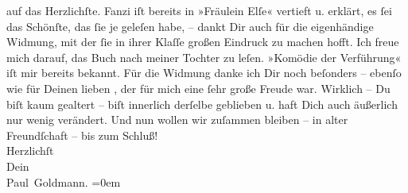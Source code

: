 \begin{ledgroupsized}[t]{13cm}
               auf das Herzlichſte. Fanzi iſt bereits in »Fräulein Elſe« vertieft u. erklärt, es ſei das
               Schönſte, das ſie je geleſen habe, – dankt Dir auch für die eigenhändige Widmung, mit
               der ſie in ihrer Klaſſe großen Eindruck zu machen hofft. Ich freue mich darauf, das
                  Buch nach meiner Tochter zu leſen. »Komödie der Verführung« iſt mir bereits bekannt.
               Für die Widmung danke ich Dir noch beſonders – ebenſo wie für Deinen lieben \label{K_L03479-2v}\label{K_L03479-2h}, der für mich eine ſehr große Freude war. Wirklich – Du {\pb}biſt kaum gealtert – biſt innerlich derſelbe
               geblieben u. haft Dich auch äußerlich nur wenig verändert.\pend
           \pstart
           Und nun wollen wir zuſammen bleiben – in alter Freundſchaft – bis zum Schluß!
               {\\[\baselineskip]}Herzlichſt {\\[\baselineskip]}Dein {\\[\baselineskip]}\spacefill\mbox{Paul Goldmann.}\pend
           \leftskip=0em{}
         
         \endnumbering{}\end{ledgroupsized}\begin{anhang}\end{anhang}\newcommand{\dateiname}{L03479}\newcommand{\titel}{Paul Goldmann an Arthur Schnitzler, 24. 10. 1925}\newcommand{\editorInnen}{Martin Anton Müller und Laura Untner}
      